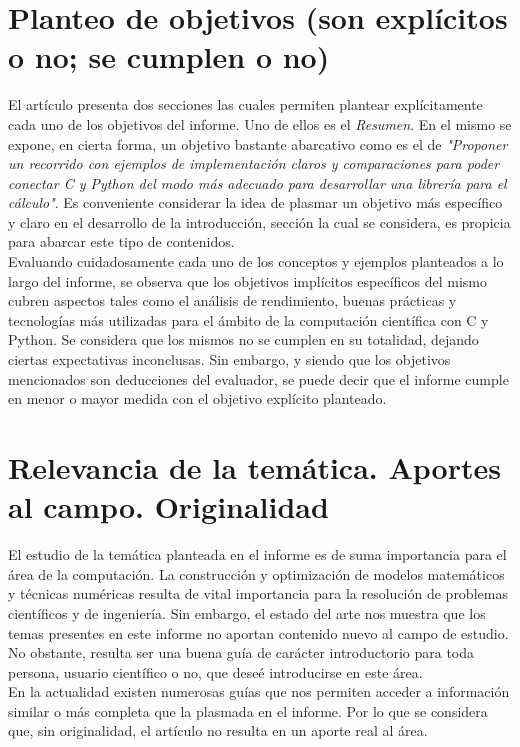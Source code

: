 \documentclass[osajnl,twocolumn,showpacs,superscriptaddress,10pt]{revtex4-1} %
\begin{document}
\section{Planteo de objetivos (son explícitos o no; se cumplen o no)}

El artículo presenta dos secciones las cuales permiten plantear explícitamente cada uno de los objetivos del informe. Uno de ellos es el \textit{Resumen}. En el mismo se expone, en cierta forma, un objetivo bastante abarcativo como es el de \textit{"Proponer un recorrido con ejemplos de implementación
claros y comparaciones para poder conectar C y Python del modo más adecuado para desarrollar una librería para el cálculo"}. Es conveniente considerar la idea de plasmar un objetivo más específico y claro en el desarrollo de la introducción, sección la cual se considera, es propicia para abarcar este tipo de contenidos. \\

Evaluando cuidadosamente cada uno de los conceptos y ejemplos planteados a lo largo del informe, se observa que los objetivos implícitos específicos del mismo cubren aspectos tales como el análisis de rendimiento, buenas prácticas y tecnologías más utilizadas para el ámbito de la computación científica con C y Python. Se considera que los mismos no se cumplen en su totalidad, dejando ciertas expectativas inconclusas. Sin embargo, y siendo que los objetivos mencionados son deducciones del evaluador, se puede decir que el informe cumple en menor o mayor medida con el objetivo explícito planteado. \\

\section{Relevancia de la temática. Aportes al campo. Originalidad}

El estudio de la temática planteada en el informe es de suma importancia para el área de la computación. La construcción y optimización de modelos matemáticos y técnicas numéricas resulta de vital importancia para la resolución de problemas científicos y de ingeniería. Sin embargo, el estado del arte nos muestra que los temas presentes en este informe no aportan contenido nuevo al campo de estudio. No obstante, resulta ser una buena guía de carácter introductorio para toda persona, usuario científico o no, que deseé introducirse en este área. \\

En la actualidad existen numerosas guías que nos permiten acceder a información similar o más completa que la plasmada en el informe. Por lo que se considera que, sin originalidad, el artículo no resulta en un aporte real al área. \\
\end{document}
